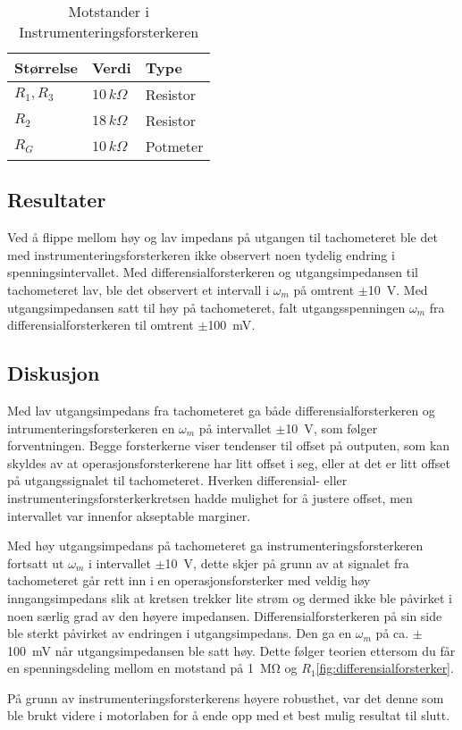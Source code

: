 \begin{table}[h]
	\centering
    \caption{Motstander i Instrumenteringsforsterkeren}
	\begin{tabular}{lll}
		\toprule
		Størrelse & Verdi & Type \\
		\midrule
        $R_1, R_3$ & $10\,k\Omega$& Resistor \\
        $R_2$ & $18\,k\Omega$ & Resistor\\
        $R_G$ & $10\,k\Omega$ & Potmeter\\
		\bottomrule
	\end{tabular}
    \label{tab:Instrumenteringsforsterker}
\end{table}







\subsection{Resultater}

Ved å flippe mellom høy og lav impedans på utgangen til tachometeret ble det med instrumenteringsforsterkeren ikke observert noen tydelig endring i spenningsintervallet. Med differensialforsterkeren og utgangsimpedansen til tachometeret lav, ble det observert et intervall i $\omega_m$ på omtrent $\pm${\SI{10}{\volt}}. Med utgangsimpedansen satt til høy på tachometeret, falt utgangsspenningen $\omega_m$ fra differensialforsterkeren til omtrent $\pm${\SI{100}{\milli\volt}}.






\subsection{Diskusjon}

Med lav utgangsimpedans fra tachometeret ga både differensialforsterkeren og intrumenteringsforsterkeren en $\omega_m$ på intervallet $\pm${\SI{10}{\volt}}, som følger forventningen. Begge forsterkerne viser tendenser til offset på outputen, som kan skyldes av at operasjonsforsterkerene har litt offset i seg, eller at det er litt offset på utgangssignalet til tachometeret. 
Hverken differensial- eller instrumenteringsforsterkerkretsen hadde mulighet for å justere offset, men intervallet var innenfor akseptable marginer.

Med høy utgangsimpedans på tachometeret ga instrumenteringsforsterkeren fortsatt ut $\omega_m$ i intervallet $\pm${\SI{10}{\volt}}, dette skjer på grunn av at signalet fra tachometeret går rett inn i en operasjonsforsterker med veldig høy inngangsimpedans slik at kretsen trekker lite strøm og dermed ikke ble påvirket i noen særlig grad av den høyere impedansen. 
Differensialforsterkeren på sin side ble sterkt påvirket av endringen i utgangsimpedans. Den ga en $\omega_m$ på ca. $\pm${\SI{100}{\milli\volt}} når utgangsimpedansen ble satt høy. Dette følger teorien ettersom du får en spenningsdeling mellom en motstand på {\SI{1}{\mega\ohm}} og $R_1$\autoref{fig:differensialforsterker}.

På grunn av instrumenteringsforsterkerens høyere robusthet, var det denne som ble brukt videre i motorlaben for å ende opp med et best mulig resultat til slutt.
